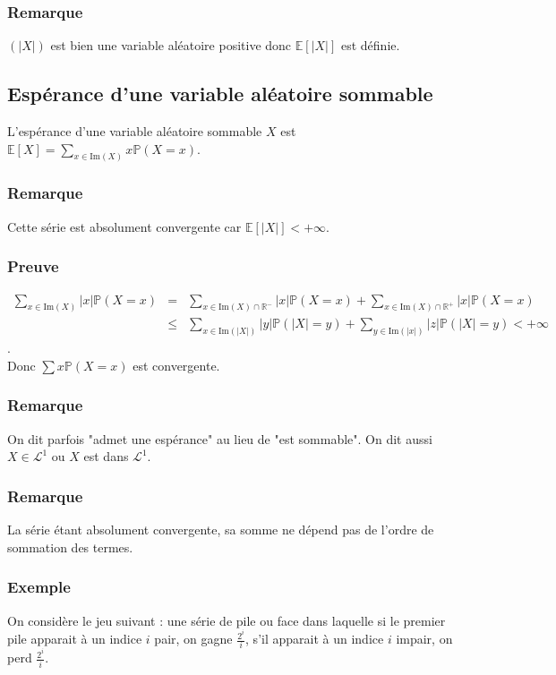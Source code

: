 \documentclass[a4paper,10pt]{book} %
\newcommand{\R}{\mathbb{R}}
\newcommand{\E}{\mathbb{E}} %
\renewcommand{\P}{\mathbb{P}} %
\newcommand\abs[1]{\left|#1\right|}
\newcommand{\Ima}{\mathrm{Im}} %
\begin{document}
\subsubsection{Remarque}
$(\abs{X})$ est bien une variable aléatoire positive donc $\E[\abs{X}]$ est définie.

\subsection{Espérance d'une variable aléatoire sommable}
L'espérance d'une variable aléatoire sommable $X$ est $\E[X]=\sum_{x\in \Ima(X)}x\P(X=x)$.

\subsubsection{Remarque}
Cette série est absolument convergente car $\E[\abs{X}]<+\infty$.

\subsubsection{Preuve}
$\begin{array}{rcl}\displaystyle \sum_{x\in \Ima(X)}\abs{x}\P(X=x)&=&\displaystyle\sum_{x\in\Ima(X)\cap \R^-}\abs{x}\P(X=x)+\sum_{x\in \Ima(X)\cap \R^+}\abs{x}\P(X=x)\\&\leq& \displaystyle\sum_{x\in \Ima(\abs{X})}\abs{y}\P(\abs{X}=y)+\sum_{y\in \Ima(\abs{x})}\abs{z}\P(\abs{X}=y)<+\infty\end{array}$.\\

Donc $\sum x\P(X=x)$ est convergente.

\subsubsection{Remarque}
On dit parfois "admet une espérance" au lieu de "est sommable". On dit aussi $X\in \mathcal{L}^1$ ou $X$ est dans $\mathcal{L}^1$.

\subsubsection{Remarque}
La série étant absolument convergente, sa somme ne dépend pas de l'ordre de sommation des termes.

\subsubsection{Exemple}
On considère le jeu suivant : une série de pile ou face dans laquelle si le premier pile apparait à un indice $i$ pair, on gagne $\frac{2^i}{i}$, s'il apparait à un indice $i$ impair, on perd $\frac{2^i}{i}$.\\
\end{document}

